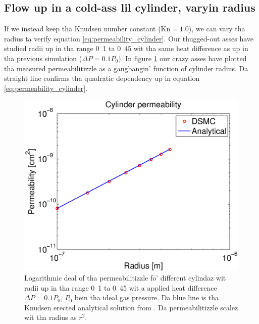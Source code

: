 \subsection{Flow up in a cold-ass lil cylinder, varyin radius}
If we instead keep tha Knudsen number constant ($\text{Kn}=1.0$), we can vary tha radius ta verify equation \eqref{eq:permeability_cylinder}. Our thugged-out asses have studied radii up in tha range \unit{0.1}{\micro\meter} ta \unit{0.45}{\micro\meter} wit tha same heat difference as up in tha previous simulation ($\Delta P = 0.1P_0)$. In figure \ref{fig:one_cylinder_varying_radii_result} our crazy asses have plotted tha measured permeabilitizzle as a gangbangin' function of cylinder radius. Da straight line confirms tha quadratic dependency up in equation \eqref{eq:permeability_cylinder}.
\begin{figure}[h]
\begin{center}
\includegraphics[width=\textwidth, trim=0cm 0cm 0cm 0cm, clip]{DSMC/figures/cylinder_radius_permeability.eps}
\end{center}
\caption{Logarithmic deal of tha permeabilitizzle fo' different cylindaz wit radii up in tha range \unit{0.1}{\micro\meter} ta \unit{0.45}{\micro\meter} wit a applied heat difference $\Delta P = 0.1P_0$, $P_0$ bein tha ideal gas pressure. Da blue line is tha Knudsen erected analytical solution from \cite{karniadakis2005microflows}. Da permeabilitizzle scalez wit tha radius as $r^2$.}
\label{fig:one_cylinder_varying_radii_result}
\end{figure}

